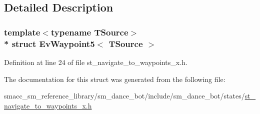 \subsection{Detailed Description}
\subsubsection*{template$<$typename T\+Source$>$\\*
struct Ev\+Waypoint5$<$ T\+Source $>$}



Definition at line 24 of file st\+\_\+navigate\+\_\+to\+\_\+waypoints\+\_\+x.\+h.



The documentation for this struct was generated from the following file\+:\begin{DoxyCompactItemize}
\item 
smacc\+\_\+sm\+\_\+reference\+\_\+library/sm\+\_\+dance\+\_\+bot/include/sm\+\_\+dance\+\_\+bot/states/\hyperlink{st__navigate__to__waypoints__x_8h}{st\+\_\+navigate\+\_\+to\+\_\+waypoints\+\_\+x.\+h}\end{DoxyCompactItemize}
